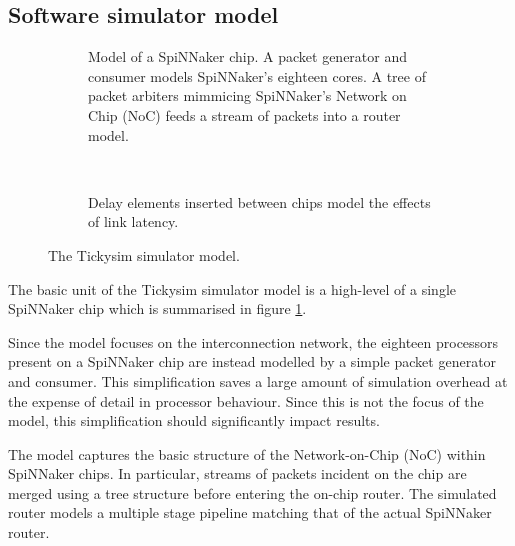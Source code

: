 		\subsection{Software simulator model}
			
			
			\begin{figure}
				\begin{subfigure}[b]{0.65\textwidth}
					\center
					\tikzexternaldisable
					
					\caption{Model of a SpiNNaker chip. A packet
					generator and consumer models SpiNNaker's eighteen cores. A tree of
					packet arbiters mimmicing SpiNNaker's Network on Chip (NoC) feeds a
					stream of packets into a router model.}
					\label{fig:tickysim-model-chip}
				\end{subfigure}
				~~~~~
				\begin{subfigure}[b]{0.28\textwidth}
					\centering
					
					\vspace{1.8cm}
					
					\caption{Delay elements inserted between chips model the effects of
					link latency.}
					\label{fig:tickysim-model-link-delays}
				\end{subfigure}
				
				\caption{The Tickysim simulator model.}
				\label{fig:tickysim-model}
			\end{figure}
			
			The basic unit of the Tickysim simulator model is a high-level of a single
			SpiNNaker chip which is summarised in figure
			\ref{fig:tickysim-model-chip}.
			
			Since the model focuses on the interconnection network, the eighteen
			processors present on a SpiNNaker chip are instead modelled by a simple
			packet generator and consumer. This simplification saves a large amount of
			simulation overhead at the expense of detail in processor behaviour. Since
			this is not the focus of the model, this simplification should
			significantly impact results.
			
			The model captures the basic structure of the Network-on-Chip (NoC) within
			SpiNNaker chips. In particular, streams of packets incident on the chip
			are merged using a tree structure before entering the on-chip router. The
			simulated router models a multiple stage pipeline matching that of the
			actual SpiNNaker router.
			
